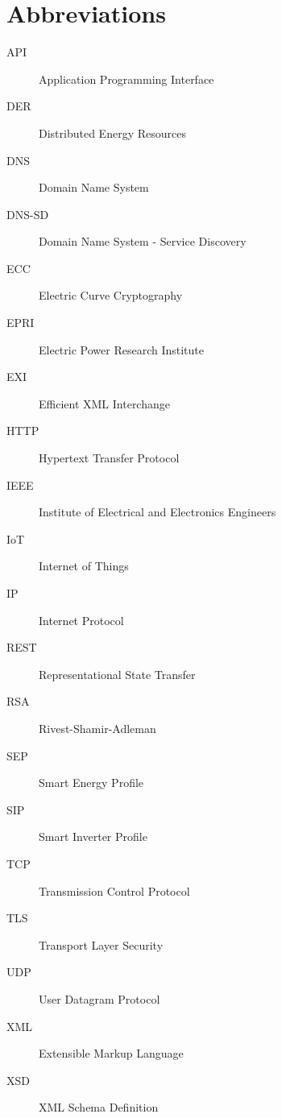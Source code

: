 \chapter*{Abbreviations}\label{abbr}
\begin{description}
\item[API] Application Programming Interface
\item[DER] Distributed Energy Resources
\item[DNS] Domain Name System
\item[DNS-SD] Domain Name System - Service Discovery
\item[ECC] Electric Curve Cryptography
\item[EPRI] Electric Power Research Institute
\item[EXI] Efficient XML Interchange
\item[HTTP] Hypertext Transfer Protocol
\item[IEEE] Institute of Electrical and Electronics Engineers
\item[IoT] Internet of Things
\item[IP] Internet Protocol 
\item[REST] Representational State Transfer
\item[RSA] Rivest-Shamir-Adleman
\item[SEP] Smart Energy Profile
\item[SIP] Smart Inverter Profile
\item[TCP] Transmission Control Protocol
\item[TLS] Transport Layer Security
\item[UDP] User Datagram Protocol
\item[XML] Extensible Markup Language
\item[XSD] XML Schema Definition
\end{description}